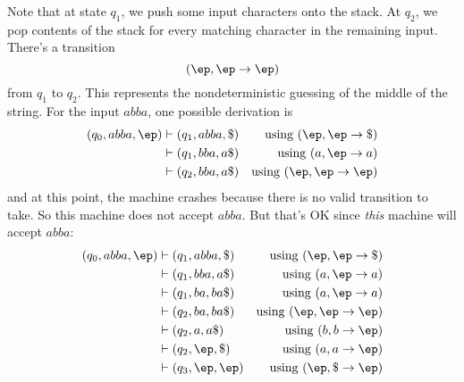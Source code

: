 \begin{eg}
\begin{center}
\end{center}
Note that at state $q_1$, we push some input characters onto the stack.
At $q_2$, we pop contents of the stack for every matching character in the
remaining input.
There's a transition
\[
(\ep, \ep \rightarrow \ep)
\]
from $q_1$ to $q_2$.
This represents the nondeterministic guessing of the middle of the string.
For the input $abba$, one possible derivation is
\begin{align*}
(q_0, abba, \ep)
&\vdash (q_1, abba, \$) &\text{using $(\ep, \ep \rightarrow \$)$} \\
&\vdash (q_1, bba, a\$) &\text{using $(a, \ep \rightarrow a)$} \\
&\vdash (q_2, bba, a\$) &\text{using $(\ep, \ep \rightarrow \ep)$}
\end{align*}
and at this point, the machine crashes because there is no valid transition
to take.
So this machine does not accept $abba$.
But that's OK since \textit{ this} machine will accept $abba$:
\begin{align*}
(q_0, abba, \ep)
&\vdash (q_1, abba, \$) &\text{using $(\ep, \ep \rightarrow \$)$} \\
&\vdash (q_1, bba, a\$) &\text{using $(a, \ep \rightarrow a)$} \\
&\vdash (q_1, ba, ba\$) &\text{using $(a, \ep \rightarrow a)$} \\
&\vdash (q_2, ba, ba\$) &\text{using $(\ep, \ep \rightarrow \ep)$} \\
&\vdash (q_2, a, a\$) &\text{using $(b, b \rightarrow \ep)$} \\
&\vdash (q_2, \ep, \$) &\text{using $(a, a \rightarrow \ep)$} \\
&\vdash (q_3, \ep, \ep) &\text{using $(\ep, \$ \rightarrow \ep)$} \\
\end{align*}
\end{eg}

\newpage


\newpage


\newpage


